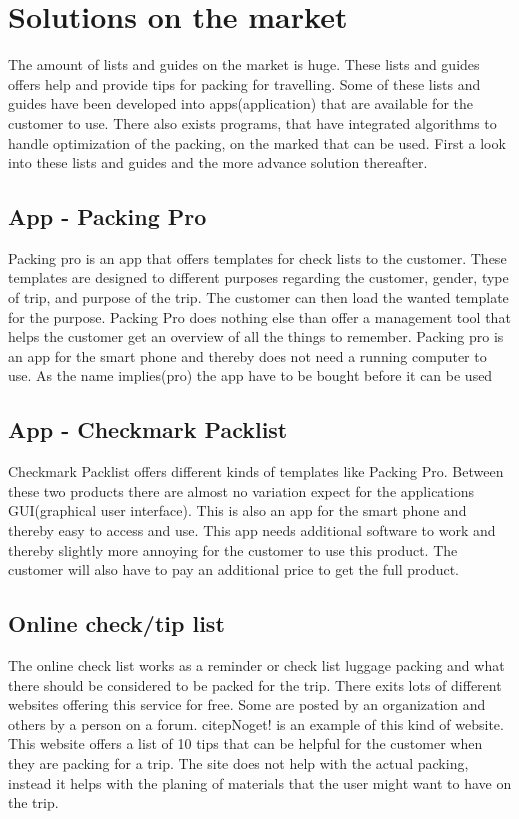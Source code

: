 \section{Solutions on the market}

The amount of lists and guides on the market is huge. These lists and guides offers help and provide tips for packing for travelling. Some of these lists and guides have been developed into apps(application) that are available for the customer to use.
There also exists programs, that have integrated algorithms to handle optimization of the packing, on the marked that can be used.
First a look into these lists and guides and the more advance solution thereafter.

\subsection{App - Packing Pro}

Packing pro is an app that offers templates for check lists to the customer. These templates are designed to different purposes regarding the customer, gender, type of trip, and purpose of the trip.
The customer can then load the wanted template for the purpose. Packing Pro does nothing else than offer a management tool that helps the customer get an overview of all the things to remember. Packing pro is an app for the smart phone and thereby does not need a running computer to use. As the name implies(pro) the app have to be bought before it can be used %

\subsection{App - Checkmark Packlist}

Checkmark Packlist offers different kinds of templates like Packing Pro. Between these two products there are almost no variation expect for the applications GUI(graphical user interface). This is also an app for the smart phone and thereby easy to access and use.
This app needs additional software to work and thereby slightly more annoying for the customer to use this product. The customer will also have to pay an additional price to get the full product. %

\subsection{Online check/tip list}

The online check list works as a reminder or check list luggage packing and what there should be considered to be packed for the trip. There exits lots of different websites offering this service for free. Some are posted by an organization and others by a person on a forum.
citep{Noget!} is an example of this kind of website. This website offers a list of 10 tips that can be helpful for the customer when they are packing for a trip. The site does not help with the actual packing, instead it helps with the planing of materials that the user might want to have on the trip.

